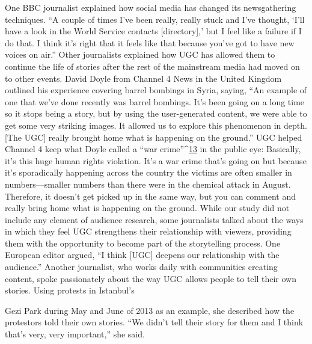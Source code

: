\begin{enumerate}
One BBC journalist explained how social media has changed its newsgathering
techniques. ``A couple of times I've been really, really stuck and I've
thought, ‘I'll have a look in the World Service contacts [directory],' but I feel
like a failure if I do that. I think it's right that it feels like that because you've
got to have new voices on air.''
Other journalists explained how UGC has allowed them to continue the
life of stories after the rest of the mainstream media had moved on to other
events. David Doyle from Channel 4 News in the United Kingdom outlined
his experience covering barrel bombings in Syria, saying, ``An example of
one that we've done recently was barrel bombings. It's been going on a long
time so it stops being a story, but by using the user-generated content, we
were able to get some very striking images. It allowed us to explore this
phenomenon in depth. [The UGC] really brought home what is happening
on the ground.''
UGC helped Channel 4 keep what Doyle called a ``war crime''^{\href{#endnotes}{13}} in the
public eye:
Basically, it's this huge human rights violation. It's a war crime that's
going on but because it's sporadically happening across the country
the victims are often smaller in numbers—smaller numbers than
there were in the chemical attack in August. Therefore, it doesn't get
picked up in the same way, but you can comment and really bring
home what is happening on the ground.
While our study did not include any element of audience research, some
journalists talked about the ways in which they feel UGC strengthens their
relationship with viewers, providing them with the opportunity to become
part of the storytelling process. One European editor argued, ``I think [UGC]
deepens our relationship with the audience.'' Another journalist, who works
daily with communities creating content, spoke passionately about the way
UGC allows people to tell their own stories. Using protests in Istanbul's

Gezi Park during May and June of 2013 as an example, she described how
the protestors told their own stories. ``We didn't tell their story for them and
I think that's very, very important,'' she said.

\end{enumerate}
